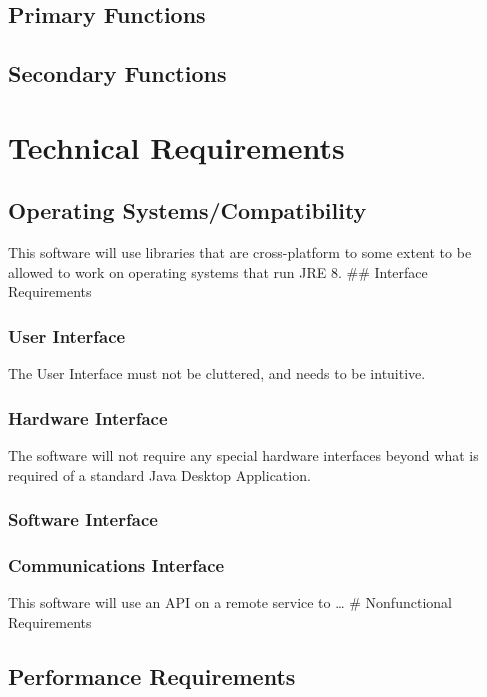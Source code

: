 \documentclass[12pt]{article}
\begin{document}
\subsection{Primary Functions}\label{primary-functions}

\subsection{Secondary Functions}\label{secondary-functions}

\section{Technical Requirements}\label{technical-requirements}

\subsection{Operating
Systems/Compatibility}\label{operating-systemscompatibility}

This software will use libraries that are cross-platform to some extent
to be allowed to work on operating systems that run JRE 8. \#\#
Interface Requirements

\subsubsection{User Interface}\label{user-interface}

The User Interface must not be cluttered, and needs to be intuitive.

\subsubsection{ Hardware Interface} The software will not require any special
hardware interfaces beyond what is required of a standard Java Desktop
Application. 
\subsubsection{ Software Interface}

\subsubsection{Communications Interface}\label{communications-interface}

This software will use an API on a remote service to \ldots{} \#
Nonfunctional Requirements

\subsection{Performance Requirements}\label{performance-requirements}
\end{document}
